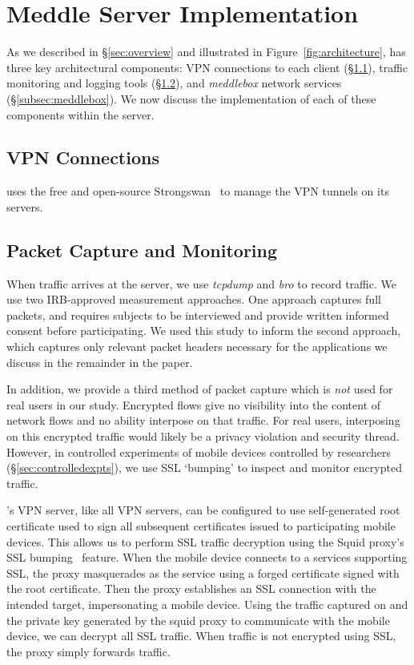 \section{Meddle Server Implementation}
\label{sec:server}

As we described in \S\ref{sec:overview} and illustrated in Figure~\ref{fig:architecture}, \meddle has three key architectural components: VPN connections to each client (\S\ref{subsec:vpn}), traffic monitoring and logging tools (\S\ref{subsec:monitoring}), and {\it meddlebox} network services (\S\ref{subsec:meddlebox}). We now discuss the implementation of each of these components within the \meddle server. 

\subsection{VPN Connections}
\label{subsec:vpn}
\meddle uses the free and open-source Strongswan~\cite{strongswan} to manage the VPN tunnels 
on its servers. 

\subsection{Packet Capture and Monitoring}
\label{subsec:monitoring}
When traffic arrives at the server, we use \emph{tcpdump} and \emph{bro} to record 
traffic. We use two IRB-approved measurement approaches. One approach captures full packets, 
and requires subjects to be interviewed and provide written informed consent before participating. 
We used this study to inform the second approach, which captures only relevant packet headers 
necessary for the applications we discuss in the remainder in the paper. 

In addition, we provide a third method of packet capture which is {\it not} used for real users in our study.
Encrypted flows give \meddle no visibility into the 
content of network flows and no ability interpose on that traffic. For real users, interposing on this encrypted traffic would likely
be a privacy violation and security thread.
However, in controlled experiments of mobile devices controlled by researchers (\S\ref{sec:controlledexpts}), we use SSL `bumping' 
to inspect and monitor encrypted traffic.
 
\meddle's VPN server, like all VPN servers, can be configured to use self-generated root certificate used to sign all subsequent certificates issued to participating mobile devices. 
This allows us to perform SSL traffic decryption using the Squid proxy's SSL bumping~\cite{sslbump} feature.
When the mobile device connects to a services supporting SSL, the proxy masquerades as the service using a forged certificate signed with the \meddle root certificate. 
Then the proxy establishes an SSL connection with the intended target, impersonating a mobile device. 
Using the traffic captured on \meddle and the private key generated by the squid proxy to communicate with the mobile device, we can decrypt all SSL traffic. When traffic is not encrypted using SSL, the proxy simply forwards traffic. 

